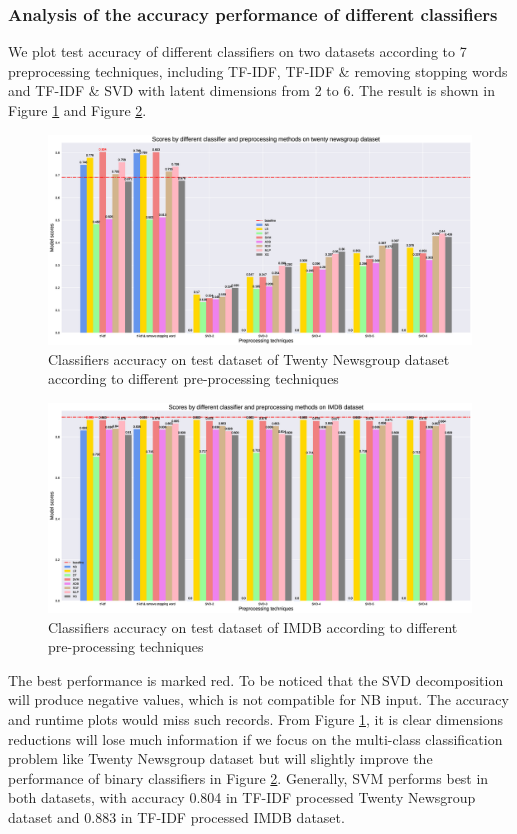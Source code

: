\documentclass[11pt]{scrartcl}
\begin{document}
\subsubsection*{Analysis of the accuracy performance of different classifiers}
We plot test accuracy of different classifiers on two datasets according to 7 preprocessing techniques, including TF-IDF, TF-IDF \& removing stopping words and TF-IDF \& SVD with latent dimensions from 2 to 6. The result is shown in Figure \ref{accuracy_20} and Figure \ref{accuracy_imdb}.

\begin{figure}[H]
	\centering
	\includegraphics[width=0.9\linewidth]{fig/model_acc_20.eps}
	\caption{Classifiers accuracy on test dataset of Twenty Newsgroup dataset according to different pre-processing techniques}
	\label{accuracy_20}
\end{figure}

\begin{figure}[H]
	\centering
	\includegraphics[width=0.9\linewidth]{fig/model_acc_imdb.eps}
	\caption{Classifiers accuracy on test dataset of IMDB according to different pre-processing techniques}
	\label{accuracy_imdb}
\end{figure}

The best performance is marked red. To be noticed that the SVD decomposition will produce negative values, which is not compatible for NB input. The accuracy and runtime plots would miss such records. From Figure \ref{accuracy_20}, it is clear dimensions reductions will lose much information if we focus on the multi-class classification problem like Twenty Newsgroup dataset but will slightly improve the performance of binary classifiers in Figure \ref{accuracy_imdb}. Generally, SVM performs best in both datasets, with accuracy 0.804 in TF-IDF processed Twenty Newsgroup dataset and 0.883 in TF-IDF processed IMDB dataset.
\end{document}
